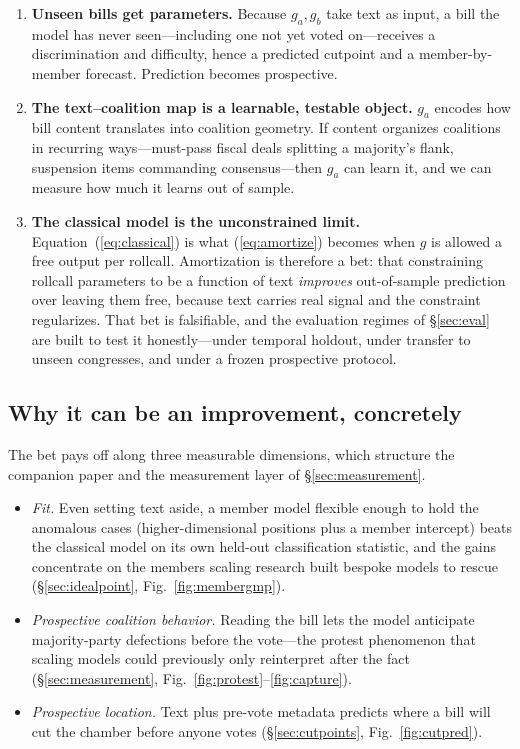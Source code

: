\documentclass[11pt]{article}
\begin{document}
\begin{enumerate}
\item \textbf{Unseen bills get parameters.} Because $g_a, g_b$ take
text as input, a bill the model has never seen---including one not yet
voted on---receives a discrimination and difficulty, hence a predicted
cutpoint and a member-by-member forecast. Prediction becomes
prospective.
\item \textbf{The text--coalition map is a learnable, testable
object.} $g_a$ encodes how bill content translates into coalition
geometry. If content organizes coalitions in recurring ways---must-pass
fiscal deals splitting a majority's flank, suspension items commanding
consensus---then $g_a$ can learn it, and we can measure how much it
learns out of sample.
\item \textbf{The classical model is the unconstrained limit.}
Equation~(\ref{eq:classical}) is what (\ref{eq:amortize}) becomes when
$g$ is allowed a free output per rollcall. Amortization is therefore a
bet: that constraining rollcall parameters to be a function of text
\emph{improves} out-of-sample prediction over leaving them free, because
text carries real signal and the constraint regularizes. That bet is
falsifiable, and the evaluation regimes of \S\ref{sec:eval} are built
to test it honestly---under temporal holdout, under transfer to unseen
congresses, and under a frozen prospective protocol.
\end{enumerate}

\subsection{Why it can be an improvement, concretely}

The bet pays off along three measurable dimensions, which structure
the companion paper and the measurement layer of \S\ref{sec:measurement}.

\begin{itemize}
\item \emph{Fit.} Even setting text aside, a member model flexible
enough to hold the anomalous cases (higher-dimensional positions plus a
member intercept) beats the classical model on its own held-out
classification statistic, and the gains concentrate on the members
scaling research built bespoke models to rescue
(\S\ref{sec:idealpoint}, Fig.~\ref{fig:membergmp}).
\item \emph{Prospective coalition behavior.} Reading the bill lets the
model anticipate majority-party defections before the vote---the
protest phenomenon that scaling models could previously only
reinterpret after the fact (\S\ref{sec:measurement},
Fig.~\ref{fig:protest}--\ref{fig:capture}).
\item \emph{Prospective location.} Text plus pre-vote metadata
predicts where a bill will cut the chamber before anyone votes
(\S\ref{sec:cutpoints}, Fig.~\ref{fig:cutpred}).
\end{itemize}
\end{document}
